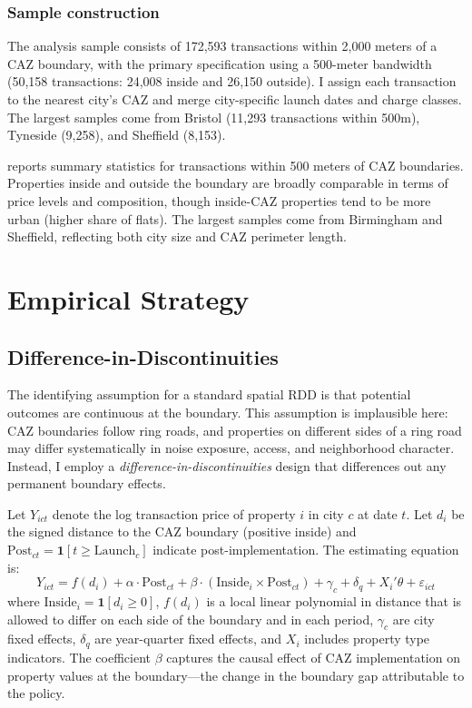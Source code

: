\documentclass[12pt]{article}
\begin{document}
\subsubsection*{Sample construction} The analysis sample consists of 172,593 transactions within 2,000 meters of a CAZ boundary, with the primary specification using a 500-meter bandwidth (50,158 transactions: 24,008 inside and 26,150 outside). I assign each transaction to the nearest city's CAZ and merge city-specific launch dates and charge classes. The largest samples come from Bristol (11,293 transactions within 500m), Tyneside (9,258), and Sheffield (8,153).



 reports summary statistics for transactions within 500 meters of CAZ boundaries. Properties inside and outside the boundary are broadly comparable in terms of price levels and composition, though inside-CAZ properties tend to be more urban (higher share of flats). The largest samples come from Birmingham and Sheffield, reflecting both city size and CAZ perimeter length.

\section{Empirical Strategy}\label{sec:strategy}

\subsection{Difference-in-Discontinuities}

The identifying assumption for a standard spatial RDD is that potential outcomes are continuous at the boundary. This assumption is implausible here: CAZ boundaries follow ring roads, and properties on different sides of a ring road may differ systematically in noise exposure, access, and neighborhood character. Instead, I employ a \textit{difference-in-discontinuities} design that differences out any permanent boundary effects.

Let $Y_{ict}$ denote the log transaction price of property $i$ in city $c$ at date $t$. Let $d_i$ be the signed distance to the CAZ boundary (positive inside) and $\text{Post}_{ct} = \mathbf{1}[t \geq \text{Launch}_c]$ indicate post-implementation. The estimating equation is:
\begin{equation}\label{eq:main}
Y_{ict} = f(d_i) + \alpha \cdot \text{Post}_{ct} + \beta \cdot (\text{Inside}_i \times \text{Post}_{ct}) + \gamma_c + \delta_{q} + X_i'\theta + \varepsilon_{ict}
\end{equation}
where $\text{Inside}_i = \mathbf{1}[d_i \geq 0]$, $f(d_i)$ is a local linear polynomial in distance that is allowed to differ on each side of the boundary and in each period, $\gamma_c$ are city fixed effects, $\delta_q$ are year-quarter fixed effects, and $X_i$ includes property type indicators. The coefficient $\beta$ captures the causal effect of CAZ implementation on property values at the boundary---the change in the boundary gap attributable to the policy.
\end{document}
